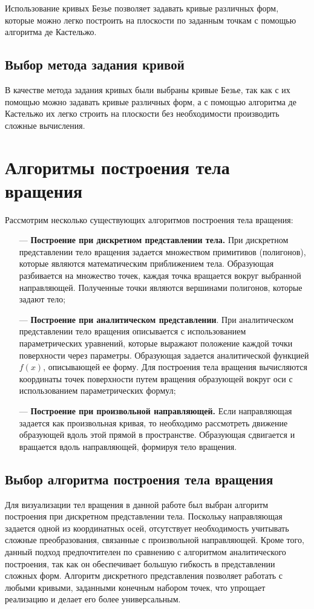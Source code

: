 Использование кривых Безье позволяет задавать кривые различных форм, которые можно легко построить на плоскости по заданным точкам с помощью алгоритма де Кастельжо.

\subsection{Выбор метода задания кривой}
В качестве метода задания кривых были выбраны кривые Безье, так как с их помощью можно задавать кривые различных форм, а с помощью алгоритма де Кастельжо их легко строить на плоскости без необходимости производить сложные вычисления. 

\section{Алгоритмы построения тела вращения}
Рассмотрим несколько существующих алгоритмов построения тела вращения:
\begin{itemize}
    \item[---] \textbf{Построение при дискретном представлении тела.} При дискретном представлении тело вращения задается множеством примитивов (полигонов), которые являются математическим приближением тела. Образующая разбивается на множество точек, каждая точка вращается вокруг выбранной направляющей. Полученные точки являются вершинами полигонов, которые задают тело;
    \item[---] \textbf{Построение при аналитическом представлении}. При аналитическом представлении тело вращения описывается с использованием параметрических уравнений, которые выражают положение каждой точки поверхности через параметры. Образующая задается аналитической функцией $f(x)$, описывающей ее форму. Для построения тела вращения вычисляются координаты точек поверхности путем вращения образующей вокруг оси с использованием параметрических формул;
    \item[---] \textbf{Построение при произвольной направляющей.} Если направляющая задается как произвольная кривая, то необходимо рассмотреть движение образующей вдоль этой прямой в пространстве. Образующая сдвигается и вращается вдоль направляющей, формируя тело вращения. 
\end{itemize}

\subsection{Выбор алгоритма построения тела вращения}
Для визуализации тел вращения в данной работе был выбран алгоритм построения при дискретном представлении тела. Поскольку направляющая задается одной из координатных осей, отсутствует необходимость учитывать сложные преобразования, связанные с произвольной направляющей. Кроме того, данный подход предпочтителен по сравнению с алгоритмом аналитического построения, так как он обеспечивает большую гибкость в представлении сложных форм. Алгоритм дискретного представления позволяет работать с любыми кривыми, заданными конечным набором точек, что упрощает реализацию и делает его более универсальным.

